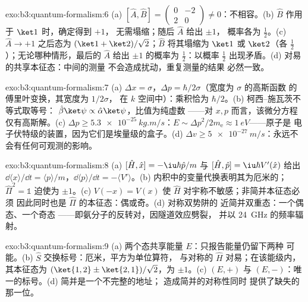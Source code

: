\begin{solution}{exo:b3:quantum-formalism:6}
(a) $[\hat A, \hat B] = \begin{pmatrix}0 & -2\\ 2 & 0\end{pmatrix}
\neq 0$：不相容。(b) $\hat B$ 作用于 $\ket1$ 时，确定得到 $+1$，
无需塌缩；随后 $\hat A$ 给出 $\pm1$，
概率各为 $\tfrac12$。(c) $\hat A \to +1$ 之后态为
$(\ket1 + \ket2)/\sqrt2$；$\hat B$ 将其塌缩为 $\ket1$ 或
$\ket2$（各 $\tfrac12$）；无论哪种情形，最后的 $\hat A$ 给出
$\pm1$ 的概率为 $\tfrac12$：以概率
$\tfrac12$ 出现矛盾。(d) 对易的共享本征态：中间的测量
不会造成扰动，重复测量的结果
必然一致。
\end{solution}

\begin{solution}{exo:b3:quantum-formalism:7}
(a) $\Delta x = \sigma$，$\Delta p = \hbar/2\sigma$（宽度为 $\sigma$ 的高斯函数
的傅里叶变换，其宽度为 $1/2\sigma$，
在 $k$ 空间中）：乘积恰为 $\hbar/2$。(b) 柯西–施瓦茨不等式取等号：
$\hat\beta\ket\psi \propto \hat\alpha\ket\psi$，比值为纯虚数
——对 $x, p$ 而言，该微分方程
仅有高斯解。(c) $\Delta p \ge \qty{5.3e-25}{kg.m/s}$：$E \sim
\Delta p^2/2m_{\text{e}} \approx \qty{1}{eV}$——原子是
电子伏特级的装置，因为它们是埃量级的盒子。(d)
$\Delta v \ge \qty{5e-27}{m/s}$：永远不会有任何可观测的影响。
\end{solution}

\begin{solution}{exo:b3:quantum-formalism:8}
(a) $[\hat H, \hat x] = -\iu\hbar\hat p/m$ 与 $[\hat H, \hat p] =
\iu\hbar V'(\hat x)$ 给出 $\dd\langle x\rangle/\dd t = \langle
p\rangle/m$，$\dd\langle p\rangle/\dd t = -\langle V'\rangle$。(b)
内积中的变量代换表明其为厄米的；
$\hat\Pi^2 = \mathbb 1$ 迫使为 $\pm1$。(c) $V(-x) =
V(x)$ 使 $\hat H$ 对宇称不敏感；非简并本征态必须
因此同时也是 $\hat\Pi$ 的本征态：偶或奇。(d) 对称双势阱的
近简并双重态：一个偶态、一个奇态
——即氨分子的反转对，因隧道效应劈裂，
并以 \qty{24}{GHz} 的频率辐射。
\end{solution}

\begin{solution}{exo:b3:quantum-formalism:9}
(a) 两个态共享能量 $E$：只报告能量仍留下两种
可能。(b) $\hat S$ 交换标号：厄米，平方为单位算符，
与对称的 $\hat H$ 对易；在该能级内，其本征态为
$(\ket{1,2} \pm \ket{2,1})/\sqrt2$，为
$\pm1$。(c) $(E, +)$ 与 $(E, -)$：唯一的标号。(d) 简并是一个不完整的地址；
造成简并的对称性同时
提供了缺失的那一位。
\end{solution}


